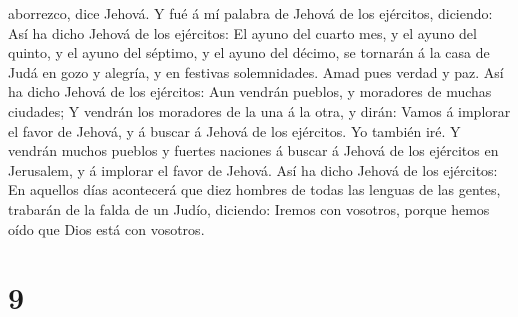 aborrezco, dice Jehová.  Y fué á mí palabra de Jehová de
los ejércitos, diciendo:  Así ha dicho Jehová de los
ejércitos: El ayuno del cuarto mes, y el ayuno del quinto, y el ayuno
del séptimo, y el ayuno del décimo, se tornarán á la casa de Judá en
gozo y alegría, y en festivas solemnidades. Amad pues verdad y paz.
 Así ha dicho Jehová de los ejércitos: Aun vendrán pueblos,
y moradores de muchas ciudades;  Y vendrán los moradores de
la una á la otra, y dirán: Vamos á implorar el favor de Jehová, y á
buscar á Jehová de los ejércitos. Yo también iré.  Y
vendrán muchos pueblos y fuertes naciones á buscar á Jehová de los
ejércitos en Jerusalem, y á implorar el favor de Jehová. 
Así ha dicho Jehová de los ejércitos: En aquellos días acontecerá que
diez hombres de todas las lenguas de las gentes, trabarán de la falda de
un Judío, diciendo: Iremos con vosotros, porque hemos oído que Dios está
con vosotros.

\hypertarget{section-8}{%
\section{9}\label{section-8}}

